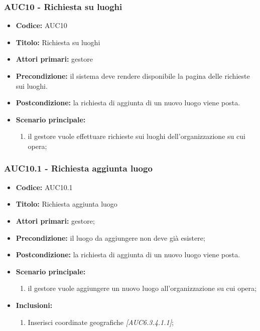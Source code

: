 \documentclass[casi-duso]{subfiles}
\begin{document}
\subsubsection{AUC10 - Richiesta su luoghi}%
\label{subsub:AUC10}
\begin{itemize}
  \item \textbf{Codice:} AUC10
  \item \textbf{Titolo:} Richiesta su luoghi
  \item \textbf{Attori primari:} gestore
  \item \textbf{Precondizione:} il sistema deve rendere disponibile la pagina delle richieste sui luoghi.
  \item \textbf{Postcondizione:} la richiesta di aggiunta di un nuovo luogo viene posta.
  \item \textbf{Scenario principale:}
  \begin{enumerate}
    \item il gestore vuole effettuare richieste sui luoghi dell'organizzazione su cui opera;
  \end{enumerate}
\end{itemize}

\subsubsection{AUC10.1 - Richiesta aggiunta luogo}%
\label{subsub:AUC10.1}
\begin{itemize}
  \item \textbf{Codice:} AUC10.1
  \item \textbf{Titolo:} Richiesta aggiunta luogo
  \item \textbf{Attori primari:} gestore;
  \item \textbf{Precondizione:} il luogo da aggiungere non deve già esistere;
  \item \textbf{Postcondizione:} la richiesta di aggiunta di un nuovo luogo viene posta.
  \item \textbf{Scenario principale:}
  \begin{enumerate}
    \item il gestore vuole aggiungere un nuovo luogo all'organizzazione su cui opera;
  \end{enumerate}
  \item \textbf{Inclusioni:}
  \begin{enumerate}
    \item Inserisci coordinate geografiche \emph{[AUC6.3.4.1.1]};
  \end{enumerate}
\end{itemize}
\end{document}
